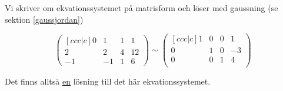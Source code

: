 \documentclass[../../main.tex]{subfiles}
\begin{document}
\begin{solution}{8}

Vi skriver om ekvationssystemet på matrisform och löser med gaussning (se sektion \ref{gaussjordan})

$$
\begin{pmatrix}[ccc|c]
0 & 1 & 1 & 1\\
2 & 2 & 4 & 12\\
-1& -1 & 1 & 6
\end{pmatrix}
\sim 
\begin{pmatrix}[ccc|c]
1 & 0 & 0 & 1\\
0 & 1 & 0 & -3\\
0 & 0 & 1 & 4\\
\end{pmatrix}
$$

Det finns alltså \underline{en} lösning till det här ekvationssystemet.

\end{solution}
\end{document}
